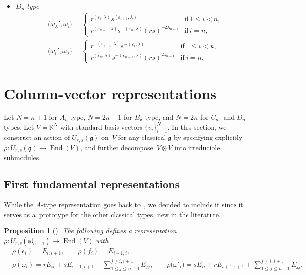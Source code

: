 \documentclass[10pt,a4paper]{amsart}
\numberwithin{equation}{section}
\newtheorem{Proposition}[Theorem]{Proposition}
 { \theoremstyle{definition}
\newtheorem{Definition}[Theorem]{Definition}
\newtheorem{Note}[Theorem]{Note}
\newtheorem{Example}[Theorem]{Example}
\newtheorem{Remark}[Theorem]{Remark} }
\DeclareMathOperator{\End}{End}
\newcommand{\fg}{\mathfrak{g}}
\newcommand{\ssl}{\mathfrak{sl}}
\newcommand{\uu}{U_{r,s}(\fg)}
\begin{document}
\begin{itemize}
\item
\emph{$D_{n}$-type}
\begin{align*}
 &\bigl(\omega_{\lambda}',\omega_{i}\bigr)=
 \begin{cases}
 r^{( \varepsilon_{i},\lambda )}s^{( \varepsilon_{i + 1},\lambda )}
 & \mathrm{if}\ 1\leq i<n, \\
 r^{( \varepsilon_{n-1},\lambda)}s^{-(\varepsilon_{n},\lambda)}(rs)^{-2\lambda_{n - 1}}
 & \mathrm{if}\ i = n,
 \end{cases} \\
 &\bigl(\omega_{i}',\omega_{\lambda}\bigr)=
 \begin{cases}
 r^{-( \varepsilon_{i + 1},\lambda )}s^{-(\varepsilon_{i},\lambda )}
 & \mathrm{if}\ 1\leq i<n ,\\
 r^{( \varepsilon_{n},\lambda )}s^{-(\varepsilon_{n-1},\lambda )}(rs)^{2\lambda_{n-1}}
 & \mathrm{if}\ i = n.
\end{cases}
\end{align*}
\end{itemize}

\section{Column-vector representations}\label{sec:column_repr}

Let $N=n+1$ for $A_n$-type, $N=2n+1$ for $B_n$-type, and $N=2n$ for $C_n$- and $D_n$-types. Let $V = \mathbb{K}^{N}$ with standard basis vectors $\{v_i\}_{i=1}^N$. In this section, we construct an action of $\uu$ on~$V$ for any classical $\fg$ by specifying explicitly $\rho\colon \uu \to \End(V)$, and further decom\-pose~${V\otimes V}$ into irreducible submodules.

\subsection{First fundamental representations}%

While the $A$-type representation goes back to~\cite{BW2}, we decided to include it since it serves as a~prototype for the other classical types, new in the literature.

\begin{Proposition}[{\cite[Section~1]{BW2}}]\label{prp:A_rep}
The following defines a representation $\rho\colon  U_{r,s}(\ssl_{n+1})\to \End(V)$ with
\begin{align*}
 & \rho(e_{i}) = E_{i,i+1} , \qquad \rho(f_{i}) = E_{i+1,i} , \\
 & \rho(\omega_{i}) =
 rE_{ii} + sE_{i+1,i+1} + \sum_{1\leq j\leq n+1}^{j\ne i,i+1} E_{jj} , \qquad
 \rho\bigl(\omega'_{i}\bigr) =
 sE_{ii} + rE_{i+1,i+1} + \sum_{1\leq j\leq n+1}^{j \neq i,i + 1} E_{jj} .
\end{align*}
\end{Proposition}
\end{document}

